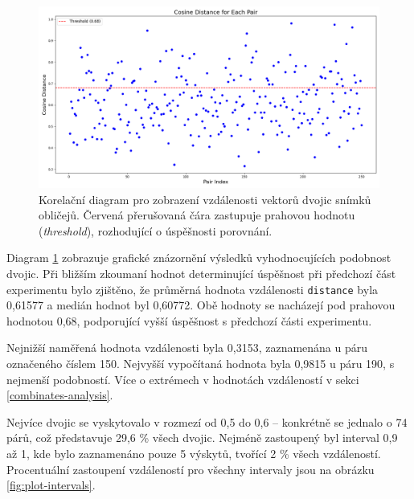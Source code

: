 \begin{figure}[H]
	\centering
	\includegraphics[width=1\textwidth]{obrazky-figures/deepface_face_distances.png}
	\caption{Korelační diagram pro zobrazení vzdálenosti vektorů dvojic snímků obličejů. Červená přerušovaná čára zastupuje prahovou hodnotu (\textit{threshold}), rozhodující o úspěšnosti porovnání.}
        \label{fig:scatter-plot-deepface}
\end{figure}

Diagram \ref{fig:scatter-plot-deepface} zobrazuje grafické znázornění výsledků vyhodnocujících podobnost dvojic. Při bližším zkoumaní hodnot determinující úspěšnost při předchozí část experimentu bylo zjištěno, že průměrná hodnota vzdálenosti \texttt{distance} byla 0,61577 a medián hodnot byl 0,60772. Obě hodnoty se nacházejí pod prahovou hodnotou 0,68, podporující vyšší úspěšnost s předchozí části experimentu.

Nejnižší naměřená hodnota vzdálenosti byla 0,3153, zaznamenána u páru označeného číslem 150. Nejvyšší vypočítaná hodnota byla 0,9815 u páru 190, s nejmenší podobností. Více o extrémech v hodnotách vzdáleností v sekci \ref{combinates-analysis}.

\bigskip

\noindent Nejvíce dvojic se vyskytovalo v rozmezí od 0,5 do 0,6 -- konkrétně se jednalo o 74 párů, což představuje 29,6 \% všech dvojic. Nejméně zastoupený byl interval 0,9 až 1, kde bylo zaznamenáno pouze 5 výskytů, tvořící 2 \% všech vzdáleností. Procentuální zastoupení vzdáleností pro všechny intervaly jsou na obrázku \ref{fig:plot-intervals}.

